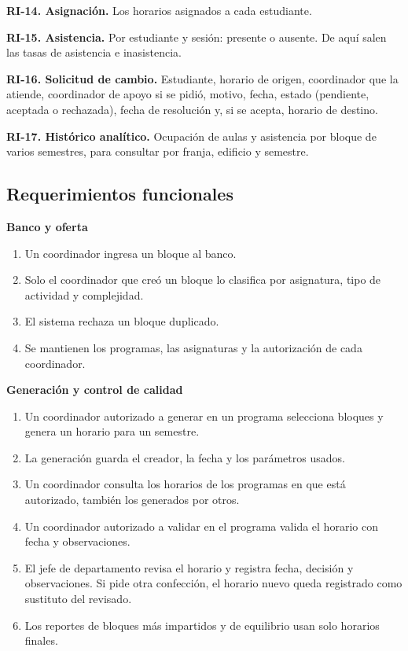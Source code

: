 \textbf{RI-14. Asignación.} Los horarios asignados a cada estudiante.

\textbf{RI-15. Asistencia.} Por estudiante y sesión: presente o ausente. De aquí salen las tasas de asistencia e inasistencia.

\textbf{RI-16. Solicitud de cambio.} Estudiante, horario de origen, coordinador que la atiende, coordinador de apoyo si se pidió, motivo, fecha, estado (pendiente, aceptada o rechazada), fecha de resolución y, si se acepta, horario de destino.

\textbf{RI-17. Histórico analítico.} Ocupación de aulas y asistencia por bloque de varios semestres, para consultar por franja, edificio y semestre.

\subsection{Requerimientos funcionales}

\textbf{Banco y oferta}
\begin{enumerate}
  \item Un coordinador ingresa un bloque al banco.
  \item Solo el coordinador que creó un bloque lo clasifica por asignatura, tipo de actividad y complejidad.
  \item El sistema rechaza un bloque duplicado.
  \item Se mantienen los programas, las asignaturas y la autorización de cada coordinador.
\end{enumerate}

\textbf{Generación y control de calidad}
\begin{enumerate}[start=5]
  \item Un coordinador autorizado a generar en un programa selecciona bloques y genera un horario para un semestre.
  \item La generación guarda el creador, la fecha y los parámetros usados.
  \item Un coordinador consulta los horarios de los programas en que está autorizado, también los generados por otros.
  \item Un coordinador autorizado a validar en el programa valida el horario con fecha y observaciones.
  \item El jefe de departamento revisa el horario y registra fecha, decisión y observaciones. Si pide otra confección, el horario nuevo queda registrado como sustituto del revisado.
  \item Los reportes de bloques más impartidos y de equilibrio usan solo horarios finales.
\end{enumerate}

